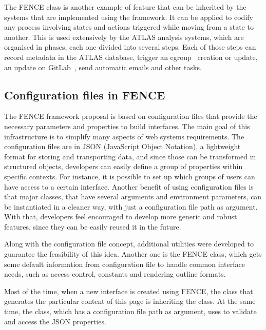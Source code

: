The FENCE  class is another example of feature that can be inherited by the systems that are implemented using the framework.
It can be applied to codify any process involving states and actions triggered while moving from a state to another.
This is used extensively by the ATLAS analysis systems, which are organised in phases, each one divided into several steps.
Each of those steps can record metadata in the ATLAS database, trigger an egroup~\cite{egroups} creation or update, an update on GitLab~\cite{gitlab}, send automatic emails and other tasks.


\subsection{Configuration files in FENCE}%
\label{sec:Configuration_files_in_FENCE}

The FENCE framework proposal is based on configuration files that provide the necessary parameters and properties to build interfaces.
The main goal of this infrastructure is to simplify many aspects of web systems requirements. The configuration files are in JSON (JavaScript Object Notation), a lightweight format for storing and transporting data, and since those can be transformed in structured objects, developers can easily define a group of properties within specific contexts.
For instance, it is possible to set up which groups of users can have access to a certain interface.
Another benefit of using configuration files is that major classes, that have several arguments and environment parameters, can be instantiated in a cleaner way, with just a configuration file path as argument.
With that, developers feel encouraged to develop more generic and robust features, since they can be easily reused it in the future.

Along with the configuration file concept, additional utilities were developed to guarantee the feasibility of this idea.
Another one is the FENCE  class, which gets some default information from configuration file to handle common interface needs, such as access control, constants and rendering outline formats.

Most of the time, when a new interface is created using FENCE, the class that generates the particular content of this page is inheriting the  class.
At the same time, the  class, which has a configuration file path as argument, uses  to validate and access the JSON properties.

